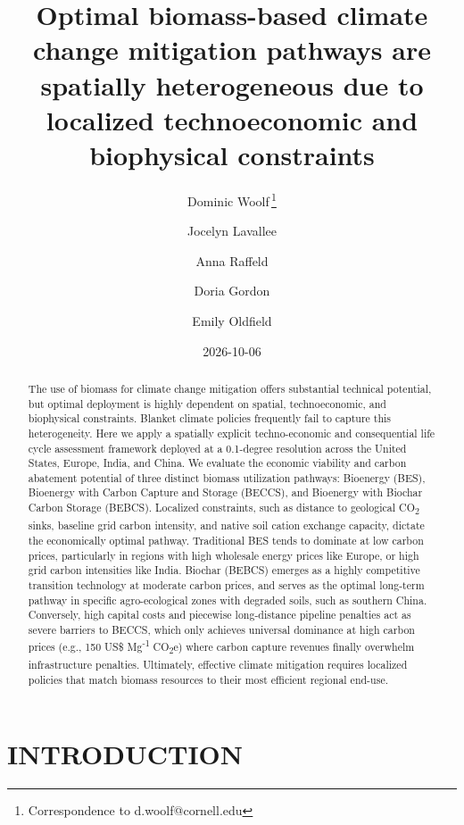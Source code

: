\documentclass[
  letterpaper,
]{article}
\author[1]{Dominic Woolf\,\thanks{Correspondence to d.woolf@cornell.edu}}
\author[2]{Jocelyn Lavallee}
\author[2]{Anna Raffeld}
\author[2]{Doria Gordon}
\author[2]{Emily Oldfield}
\affil[1]{Cornell University}
\affil[2]{Environmental Defense Fund}
\title{Optimal biomass-based climate change mitigation pathways are
spatially heterogeneous due to localized technoeconomic and biophysical
constraints}
\author{}
\date{2026-10-06}
\begin{document}
\maketitle
\begin{abstract}
The use of biomass for climate change mitigation offers substantial
technical potential, but optimal deployment is highly dependent on
spatial, technoeconomic, and biophysical constraints. Blanket climate
policies frequently fail to capture this heterogeneity. Here we apply a
spatially explicit techno-economic and consequential life cycle
assessment framework deployed at a 0.1-degree resolution across the
United States, Europe, India, and China. We evaluate the economic
viability and carbon abatement potential of three distinct biomass
utilization pathways: Bioenergy (BES), Bioenergy with Carbon Capture and
Storage (BECCS), and Bioenergy with Biochar Carbon Storage (BEBCS).
Localized constraints, such as distance to geological
CO\textsubscript{2} sinks, baseline grid carbon intensity, and native
soil cation exchange capacity, dictate the economically optimal pathway.
Traditional BES tends to dominate at low carbon prices, particularly in
regions with high wholesale energy prices like Europe, or high grid
carbon intensities like India. Biochar (BEBCS) emerges as a highly
competitive transition technology at moderate carbon prices, and serves
as the optimal long-term pathway in specific agro-ecological zones with
degraded soils, such as southern China. Conversely, high capital costs
and piecewise long-distance pipeline penalties act as severe barriers to
BECCS, which only achieves universal dominance at high carbon prices
(e.g., 150 US\$ Mg\textsuperscript{-1} CO\textsubscript{2}e) where
carbon capture revenues finally overwhelm infrastructure penalties.
Ultimately, effective climate mitigation requires localized policies
that match biomass resources to their most efficient regional end-use.
\end{abstract}


\section{INTRODUCTION}\label{introduction}
\end{document}
